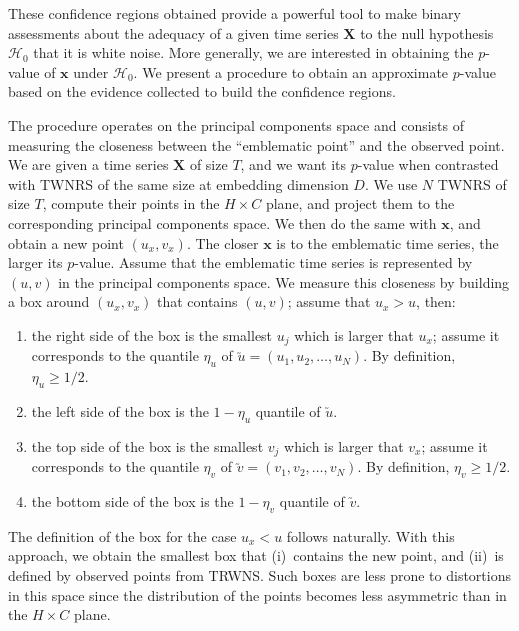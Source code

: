 \documentclass[a4,11pt]{pssbmac}
\begin{document}
These confidence regions obtained provide a powerful tool to make binary assessments about the adequacy of a given time series $\bm X$ to the null hypothesis $\mathcal H_0$ that it is white noise.
More generally, we are interested in obtaining the $p$-value of $\bm x$ under $\mathcal H_0$.
We present a procedure to obtain an approximate $p$-value based on the evidence collected to build the confidence regions.

The procedure operates on the principal components space and consists of measuring the closeness between the ``emblematic point'' and the observed point.
We are given a time series $\bm X$ of size $T$, and we want its $p$-value when contrasted with TWNRS of the same size at embedding dimension $D$.
We use $N$ TWNRS of size $T$, compute their points in the $H\times C$ plane, and project them to the corresponding principal components space.
We then do the same with $\bm x$, and obtain a new point $(u_x,v_x)$.
The closer $\bm x$ is to the emblematic time series, the larger its $p$-value.
Assume that the emblematic time series is represented by $(u,v)$ in the principal components space.
We measure this closeness by building a box around $(u_x,v_x)$ that contains $(u,v)$; assume that $u_x>u$, then:
\begin{enumerate}
	\item the right side of the box is the smallest $u_j$ which is larger that $u_x$; assume it corresponds to the quantile $\eta_u$ of $\utilde u = (u_1,u_2,\dots, u_N)$. By definition, $\eta_u\geq 1/2$.
	\item the left side of the box is the $1-\eta_u$ quantile of $\utilde u$.
	\item the top side of the box is the smallest $v_j$ which is larger that $v_x$; assume it corresponds to the quantile $\eta_v$ of $\utilde v = (v_1,v_2,\dots, v_N)$. By definition, $\eta_v\geq 1/2$.
	\item the bottom side of the box is the $1-\eta_v$ quantile of $\utilde v$.
\end{enumerate}

The definition of the box for the case $u_x<u$ follows naturally.
With this approach, we obtain the smallest box that (i)~contains the new point, and (ii)~is defined by observed points from TRWNS.
Such boxes are less prone to distortions in this space since the distribution of the points becomes less asymmetric than in the $H\times C$ plane.
\end{document}
